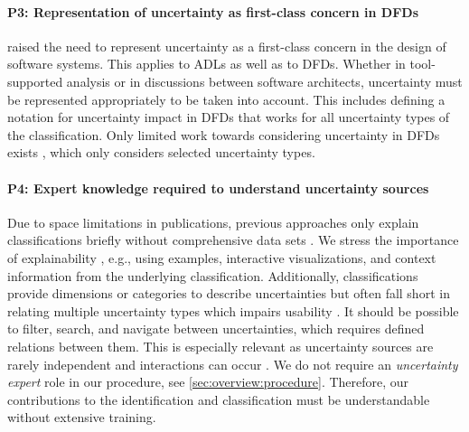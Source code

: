 \paragraph{P3: Representation of uncertainty as first-class concern in \acp{DFD}}\label{p:1:3}
\textcite{garlan_software_2010} raised the need to represent uncertainty as a first-class concern in the design of software systems.
This applies to \acp{ADL} as well as to \acp{DFD}.
Whether in tool-supported analysis or in discussions between software architects, uncertainty must be represented appropriately to be taken into account.
This includes defining a notation for uncertainty impact in \acp{DFD} that works for all uncertainty types of the classification.
Only limited work towards considering uncertainty in \acp{DFD} exists \cite{durugbo_data_2010}, which only considers selected uncertainty types.

\paragraph{P4: Expert knowledge required to understand uncertainty sources}\label{p:1:4}
Due to space limitations in publications, previous approaches only explain classifications briefly without comprehensive data sets \cite{ramirez_taxonomy_2012}.
We stress the importance of explainability \cite{bersani_conceptual_2023}, e.g., using examples, interactive visualizations, and context information from the underlying classification.
Additionally, classifications provide dimensions or categories to describe uncertainties but often fall short in relating multiple uncertainty types which impairs usability \cite{hahner_classification_2023}.
It should be possible to filter, search, and navigate between uncertainties, which requires defined relations between them.
This is especially relevant as uncertainty sources are rarely independent and interactions can occur \cite{camara_uncertainty_2024}.
We do not require an \emph{uncertainty expert} role in our procedure, see \autoref{sec:overview:procedure}.
Therefore, our contributions to the identification and classification must be understandable without extensive training.

